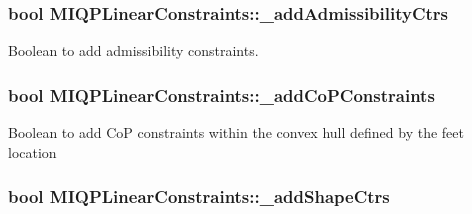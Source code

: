 \hypertarget{classMIQPLinearConstraints_a155ab4ad5ab14b793611c12473ce9297}{
\subsubsection[{\-\_\-add\-Admissibility\-Ctrs}]{\setlength{\rightskip}{0pt plus 5cm}bool {\bf \-M\-I\-Q\-P\-Linear\-Constraints\-::\-\_\-add\-Admissibility\-Ctrs}}}\label{classMIQPLinearConstraints_a155ab4ad5ab14b793611c12473ce9297}
\-Boolean to add admissibility constraints. \hypertarget{classMIQPLinearConstraints_a8e20d42828c638f41d074153cc0957d8}{
\subsubsection[{\-\_\-add\-Co\-P\-Constraints}]{\setlength{\rightskip}{0pt plus 5cm}bool {\bf \-M\-I\-Q\-P\-Linear\-Constraints\-::\-\_\-add\-Co\-P\-Constraints}}}\label{classMIQPLinearConstraints_a8e20d42828c638f41d074153cc0957d8}
\-Boolean to add \-Co\-P constraints within the convex hull defined by the feet location \hypertarget{classMIQPLinearConstraints_ae8df8b83e80484853b624f6693ed2725}{
\subsubsection[{\-\_\-add\-Shape\-Ctrs}]{\setlength{\rightskip}{0pt plus 5cm}bool {\bf \-M\-I\-Q\-P\-Linear\-Constraints\-::\-\_\-add\-Shape\-Ctrs}}}\label{classMIQPLinearConstraints_ae8df8b83e80484853b624f6693ed2725}
